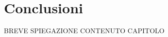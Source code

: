 \chapter{Conclusioni} %
%

\begin{citazione}
BREVE SPIEGAZIONE CONTENUTO CAPITOLO
\end{citazione}

\newpage
